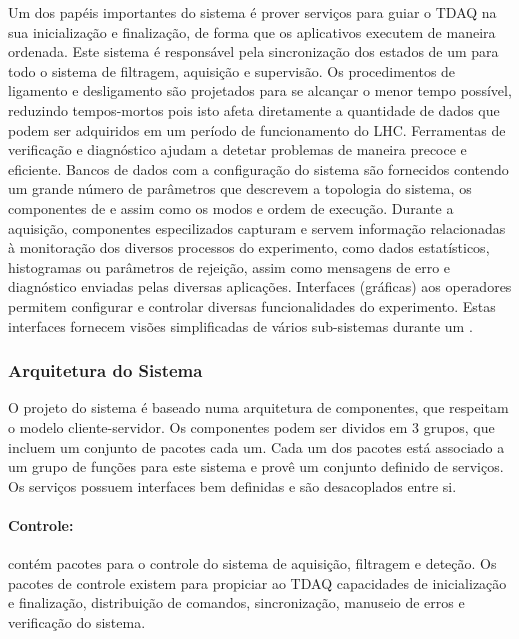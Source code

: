 Um dos papéis importantes do sistema  é prover serviços para guiar
o TDAQ na sua inicialização e finalização, de forma que os aplicativos
executem de maneira ordenada. Este sistema é responsável pela sincronização
dos estados de um  para todo o sistema de filtragem, aquisição e
supervisão. Os procedimentos de ligamento e desligamento são projetados para
se alcançar o menor tempo possível, reduzindo tempos-mortos pois isto afeta
diretamente a quantidade de dados que podem ser adquiridos em um período de
funcionamento do LHC. Ferramentas de verificação e diagnóstico ajudam a
detetar problemas de maneira precoce e eficiente. Bancos de dados com a
configuração do sistema são fornecidos contendo um grande número de parâmetros
que descrevem a topologia do sistema, os componentes de
 e  assim como os modos e ordem de
execução. Durante a aquisição, componentes especilizados capturam e servem
informação relacionadas à monitoração dos diversos processos do experimento,
como dados estatísticos, histogramas ou parâmetros de rejeição, assim como
mensagens de erro e diagnóstico enviadas pelas diversas aplicações. Interfaces
(gráficas) aos operadores permitem configurar e controlar diversas
funcionalidades do experimento. Estas interfaces fornecem visões simplificadas
de vários sub-sistemas durante um .

\subsubsection{Arquitetura do Sistema }
\label{sec:online-arch}

O projeto do sistema  é baseado numa arquitetura de componentes,
que respeitam o modelo cliente-servidor. Os componentes podem ser dividos em 3
grupos, que incluem um conjunto de pacotes cada um. Cada um dos pacotes está
associado a um grupo de funções para este sistema e provê um conjunto definido
de serviços. Os serviços possuem interfaces bem definidas e são desacoplados
entre si.

\paragraph{Controle:} contém pacotes para o controle do sistema de
aquisição, filtragem e deteção. Os pacotes de controle existem para propiciar
ao TDAQ capacidades de inicialização e finalização, distribuição de comandos,
sincronização, manuseio de erros e verificação do sistema.

